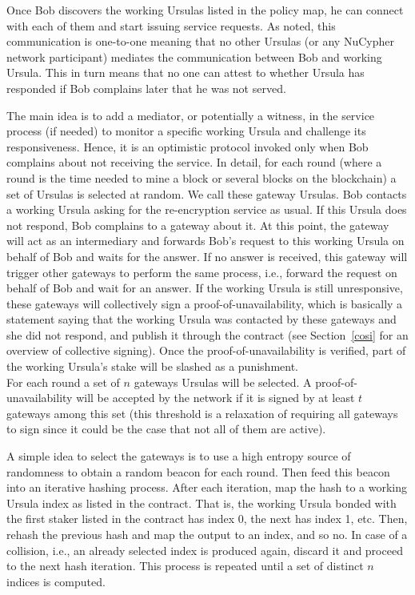  Once Bob discovers the working Ursulas listed in the policy map, he can connect with each of them and start issuing service requests. As noted, this communication is one-to-one meaning that no other Ursulas (or any 
NuCypher network participant) mediates the communication between Bob and working  
Ursula. This in turn means that no one can attest to whether Ursula has responded if Bob 
complains later that he was not served.


The main idea is to add a mediator, or potentially a witness, in the service process (if needed) to monitor a specific working Ursula and challenge its responsiveness. Hence, it is an optimistic protocol invoked only when Bob complains about not receiving the service. In detail, for each round (where a 
round is the time needed to mine a block or several blocks on the blockchain) a set of Ursulas is selected at random. We call these gateway Ursulas. Bob contacts a working Ursula asking for the re-encryption service as usual. 
If this Ursula does not respond, Bob complains to a gateway about it. At this point, the gateway will act as an intermediary and forwards Bob's request to this working Ursula on behalf of Bob and waits for the answer. If no answer is received, this gateway will trigger other gateways to perform the same process, i.e., forward the request on behalf of Bob and wait for an answer. If the working 
Ursula is still unresponsive, these gateways will collectively sign a proof-of-unavailability, which is basically a statement saying that the working Ursula was contacted by these gateways and she did not respond, and publish it through the \stakeescrow contract (see Section~\ref{cosi} for an overview of collective signing). Once the proof-of-unavailability is verified, part of the working Ursula's stake will be slashed as a punishment. \\


 For each round a set of $n$ gateways Ursulas will be selected. A proof-of-unavailability will be accepted by the network if it is signed by at least $t$ gateways among this set (this threshold is a relaxation of requiring all gateways to sign since it could be the case that not all of them are active). 


A simple idea to select the gateways is to use a high entropy source of randomness to obtain a random beacon for each round. Then feed this beacon into an iterative hashing process. After each iteration, map the hash to a working Ursula index as listed in the \stakeescrow contract. That is, the working Ursula bonded with the first staker listed in the contract has index 0, the next has index 1, etc. Then, rehash the previous hash and map the output to an index, and so no. In case of a collision, i.e., an already selected index is produced again, discard it and proceed to the next hash iteration. This process is repeated until a set of distinct $n$ indices is computed. 


